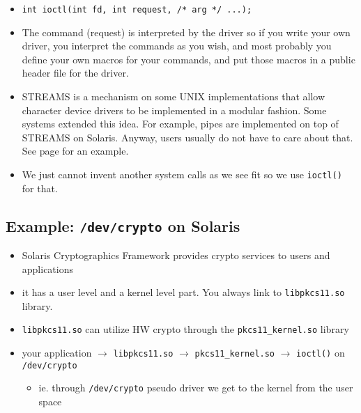 \begin{itemize}
\item \texttt{int ioctl(int fd, int request, /* arg */ ...);}
\item The command (request) is interpreted by the driver so if you write your
own driver, you interpret the commands as you wish, and most probably you define
your own macros for your commands, and put those macros in a public header file
for the driver.
\item STREAMS is a mechanism on some UNIX implementations that allow character
device drivers to be implemented in a modular fashion. Some systems extended
this idea. For example, pipes are implemented on top of STREAMS on Solaris.
Anyway, users usually do not have to care about that. See page
\pageref{IOCTLEXAMPLE} for an example.
\item We just cannot invent another system calls as we see fit so we use
\texttt{ioctl()} for that.
\end{itemize}

\subsection{Example: \texttt{/dev/crypto} on Solaris}

\begin{itemize}
\item Solaris Cryptographics Framework provides crypto services to users and
applications
\item it has a user level and a kernel level part. You always link to
\texttt{libpkcs11.so} library.
\item \texttt{libpkcs11.so} can utilize HW crypto through the
\texttt{pkcs11\_kernel.so} library
\item your application $\rightarrow$ \texttt{libpkcs11.so} $\rightarrow$
\texttt{pkcs11\_kernel.so} $\rightarrow$
\texttt{ioctl()} on \texttt{/dev/crypto}
	\begin{itemize}
	\item ie. through \texttt{/dev/crypto} pseudo driver we get to the
	kernel from the user space
	\end{itemize}
\end{itemize}

